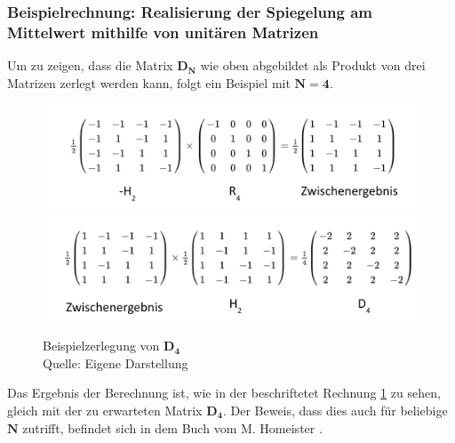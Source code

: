 \subsubsection{Beispielrechnung: Realisierung der Spiegelung am Mittelwert  mithilfe von unitären Matrizen}
Um zu zeigen, dass die Matrix $\mathbf{D_N}$ wie oben abgebildet als Produkt von drei Matrizen zerlegt werden kann, folgt ein Beispiel mit $\mathbf{N = 4}$.
\begin{figure}[hbtp]
	\centering
	\includegraphics[width=.8\textwidth]{figures/householderLokal_1.png}
	\includegraphics[width=.8\textwidth]{figures/householderLokal_2.png}
	\caption{Beispielzerlegung von $\mathbf{D_4}$ \\ Quelle: Eigene Darstellung}
	\label{fig:DLokal}
\end{figure}
Das Ergebnis der Berechnung ist, wie in der beschriftetet Rechnung \ref{fig:DLokal} zu sehen, gleich mit der zu erwarteten Matrix $\mathbf{D_4}$. Der Beweis, dass dies auch für beliebige $\mathbf{N}$ zutrifft, befindet sich in dem Buch vom M. Homeister \cite[S. 309]{Ho17}.

